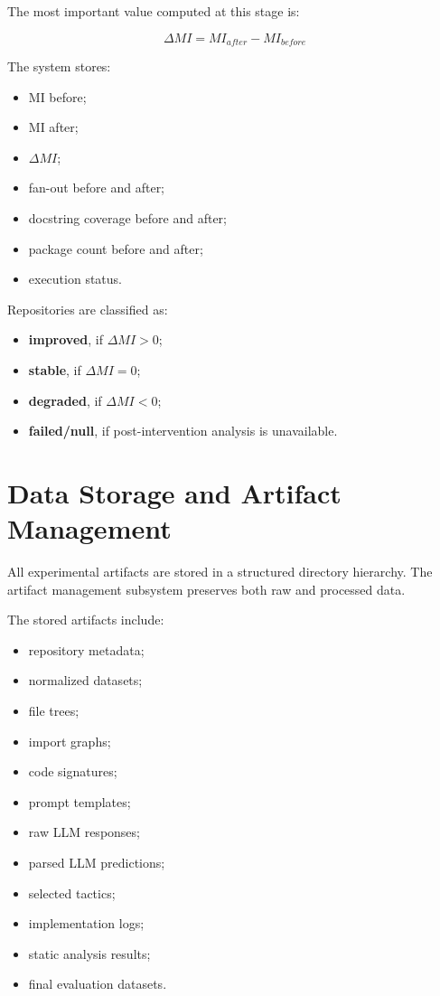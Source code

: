 The most important value computed at this stage is:

\begin{equation}
\Delta MI = MI_{after} - MI_{before}
\end{equation}

The system stores:

\begin{itemize}
    \item MI before;
    \item MI after;
    \item $\Delta MI$;
    \item fan-out before and after;
    \item docstring coverage before and after;
    \item package count before and after;
    \item execution status.
\end{itemize}

Repositories are classified as:

\begin{itemize}
    \item \textbf{improved}, if $\Delta MI > 0$;
    \item \textbf{stable}, if $\Delta MI = 0$;
    \item \textbf{degraded}, if $\Delta MI < 0$;
    \item \textbf{failed/null}, if post-intervention analysis is unavailable.
\end{itemize}

\section{Data Storage and Artifact Management}

All experimental artifacts are stored in a structured directory hierarchy. The artifact management subsystem preserves both raw and processed data.

The stored artifacts include:

\begin{itemize}
    \item repository metadata;
    \item normalized datasets;
    \item file trees;
    \item import graphs;
    \item code signatures;
    \item prompt templates;
    \item raw LLM responses;
    \item parsed LLM predictions;
    \item selected tactics;
    \item implementation logs;
    \item static analysis results;
    \item final evaluation datasets.
\end{itemize}


